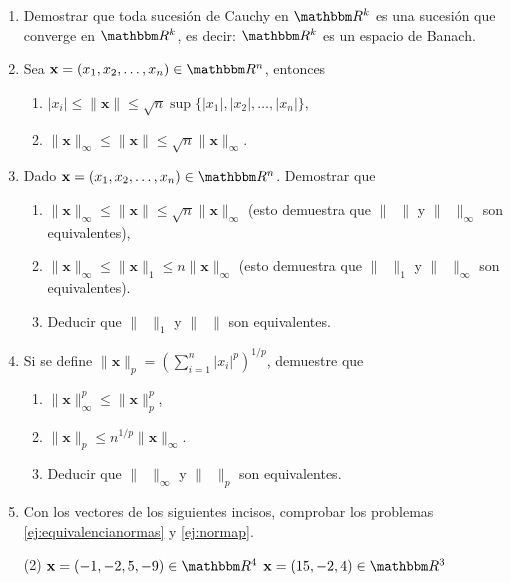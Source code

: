 \begin{enumerate}
    \item Demostrar que toda sucesión de Cauchy en $\RR[k]$ es una sucesión que converge en $\RR[k]$, es decir: $\RR[k]$ es un espacio de Banach.
    \item Sea $\mathbf{x} = (x_1, x_2, \dots, x_n) \in \RR[n]$, entonces
    \begin{enumerate}
        \item $|x_i| \leq \| \mathbf{x} \| \leq \sqrt{n} \sup \{ |x_1|, |x_2|, \dots, |x_n| \}$,
        \item $\| \mathbf{x} \|_{\infty} \leq \| \mathbf{x} \| \leq \sqrt{n} \| \mathbf{x} \|_{\infty}$.
    \end{enumerate}
    \item Dado $\mathbf{x} = (x_1, x_2, \dots, x_n) \in \RR[n]$. Demostrar que \label{ej:equivalencianormas}
    \begin{enumerate}
        \item $\| \mathbf{x} \|_{\infty} \leq \| \mathbf{x} \| \leq \sqrt{n} \| \mathbf{x} \|_{\infty}$ (esto demuestra que $\| \phantom{x} \|$ y $\| \phantom{x} \|_{\infty}$ son equivalentes),
        \item $\| \mathbf{x} \|_{\infty} \leq \| \mathbf{x} \|_1 \leq n \| \mathbf{x} \|_{\infty}$ (esto demuestra que $\| \phantom{x} \|_1$ y $\| \phantom{x} \|_{\infty}$ son equivalentes).
        \item Deducir que $\| \phantom{x} \|_1$ y $\| \phantom{x} \|$ son equivalentes.
    \end{enumerate}
    \item Si se define $\displaystyle \| \mathbf{x} \|_p = \left( \sum_{i=1}^n |x_i|^p \right)^{1/p}$, demuestre que \label{ej:normap}
    \begin{enumerate}
        \item $\| \mathbf{x} \|_{\infty}^p \leq \| \mathbf{x} \|_p^p$,
        \item $\| \mathbf{x} \|_p \leq n^{1/p} \| \mathbf{x} \|_{\infty}$.
        \item Deducir que $\| \phantom{x} \|_{\infty}$ y $\| \phantom{x} \|_p$ son equivalentes.
    \end{enumerate}
    \item Con los vectores de los siguientes incisos, comprobar los problemas \ref{ej:equivalencianormas} y \ref{ej:normap}.
    \begin{tasks}[label=\roman*)](2)
        \task $\mathbf{x} = (-1, -2, 5, -9) \in \RR[4]$
        \task $\mathbf{x} = (15, -2, 4) \in \RR[3]$
    \end{tasks}
\end{enumerate}


